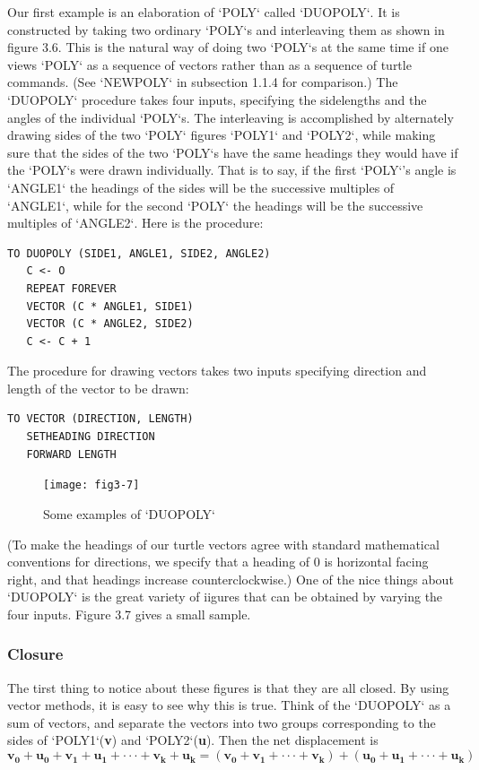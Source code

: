 \documentclass{book}
\begin{document}
Our first example is an elaboration of \textsc{`POLY`} called \textsc{`DUOPOLY`}. It is
constructed by taking two ordinary \textsc{`POLY`}s and interleaving them as
shown in figure 3.6. This is the natural way of doing two \textsc{`POLY`}s at
the same time if one views \textsc{`POLY`} as a sequence of vectors rather than
as a sequence of turtle commands. (See \textsc{`NEWPOLY`} in subsection 1.1.4 for
comparison.) The \textsc{`DUOPOLY`} procedure takes four inputs, specifying the
sidelengths and the angles of the individual \textsc{`POLY`}s. The interleaving is
accomplished by alternately drawing sides of the two \textsc{`POLY`} figures \textsc{`POLY1`}
and \textsc{`POLY2`}, while making sure that the sides of the two \textsc{`POLY`}s have the
same headings they would have if the \textsc{`POLY`}s were drawn individually.
That is to say, if the first \textsc{`POLY`}'s angle is \textsc{`ANGLE1`} the headings of the
sides will be the successive multiples of \textsc{`ANGLE1`}, while for the second
\textsc{`POLY`} the headings will be the successive multiples of \textsc{`ANGLE2`}. Here is
the procedure:

\begin{verbatim}
TO DUOPOLY (SIDE1, ANGLE1, SIDE2, ANGLE2)
   C <- O
   REPEAT FOREVER
   VECTOR (C * ANGLE1, SIDE1)
   VECTOR (C * ANGLE2, SIDE2)
   C <- C + 1
\end{verbatim}
The procedure for drawing vectors takes two inputs specifying direction
and length of the vector to be drawn:

\begin{verbatim}
TO VECTOR (DIRECTION, LENGTH)
   SETHEADING DIRECTION
   FORWARD LENGTH
\end{verbatim}
\begin{figure}
\begin{center}
\texttt{[image: fig3-7]}
\caption{Some examples of \textsc{`DUOPOLY`}}
\end{center}
\end{figure}


(To make the headings of our turtle vectors agree with standard mathematical conventions for directions, we specify that a heading of 0 is
horizontal facing right, and that headings increase counterclockwise.)
One of the nice things about \textsc{`DUOPOLY`} is the great variety of iigures
that can be obtained by varying the four inputs. Figure 3.7 gives a small
sample.

\subsubsection{Closure}
The tirst thing to notice about these figures is that they are all closed.
By using vector methods, it is easy to see why this is true. Think of the
\textsc{`DUOPOLY`} as a sum of vectors, and separate the vectors into two groups
corresponding to the sides of \textsc{`POLY1`}(\textbf{v}) and \textsc{`POLY2`}(\textbf{u}). Then the net
displacement is
$$\mathbf{v_0}+\mathbf{u_0}+\mathbf{v_1}+\mathbf{u_1}+\cdot \cdot \cdot+\mathbf{v_k}+\mathbf{u_k}=(\mathbf{v_0}+\mathbf{v_1}+\cdot \cdot \cdot + \mathbf{v_k})+(\mathbf{u_0}+\mathbf{u_1}+\cdot \cdot \cdot+\mathbf{u_k})$$
\end{document}

